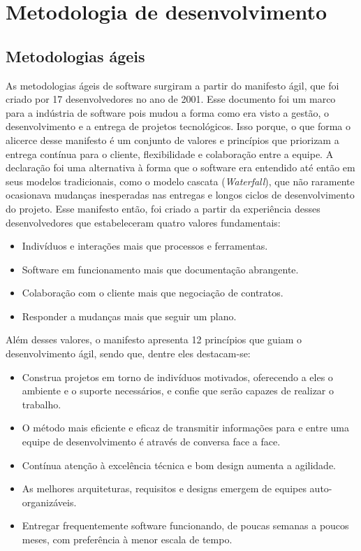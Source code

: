 \section{Metodologia de desenvolvimento}
\subsection{Metodologias ágeis}
As metodologias ágeis de software surgiram a partir do manifesto ágil, que foi criado por 17 desenvolvedores no ano de 2001. Esse documento foi um marco para a indústria de software pois mudou a forma como era visto a gestão, o desenvolvimento e a entrega de projetos tecnológicos. Isso porque, o que forma o alicerce desse manifesto é
um conjunto de valores e princípios que priorizam a entrega contínua para o cliente, flexibilidade e colaboração entre a equipe. A declaração foi uma alternativa à forma que o software era entendido até então em seus modelos tradicionais, como o modelo cascata (\textit{Waterfall}), que não raramente ocasionava mudanças inesperadas nas entregas e longos ciclos de desenvolvimento do projeto. Esse manifesto então, foi criado a partir da experiência desses desenvolvedores que estabeleceram quatro valores fundamentais: 

\begin{itemize}
    \item Indivíduos e interações mais que processos e ferramentas.
    \item Software em funcionamento mais que documentação abrangente.
    \item Colaboração com o cliente mais que negociação de contratos.
    \item Responder a mudanças mais que seguir um plano.
\end{itemize}


Além desses valores, o manifesto apresenta 12 princípios que guiam o desenvolvimento ágil, sendo que, dentre eles destacam-se:

\begin{itemize}
    \item Construa projetos em torno de indivíduos motivados, oferecendo a eles o ambiente e o suporte necessários, e confie que serão capazes de realizar o trabalho.
    \item O método mais eficiente e eficaz de transmitir informações para e entre uma equipe de desenvolvimento é através de conversa face a face.
    \item Contínua atenção à excelência técnica e bom design aumenta a agilidade.
    \item As melhores arquiteturas, requisitos e designs emergem de equipes auto-organizáveis.
    \item Entregar frequentemente software funcionando, de poucas semanas a poucos meses, com preferência à menor escala de tempo.
\end{itemize}

